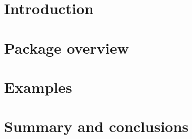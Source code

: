 \documentclass{juliacon}
\begin{document}


\maketitle


\begin{abstract}

Neural networks are typically sensitive to small input perturbations, leading to unexpected or brittle behaviour. 
We present \verb|RobustNeuralNetworks.jl|: a Julia package for neural network models that are constructed to naturally satisfy a set of user-defined robustness metrics. The package is based on the recently proposed Recurrent Equilibrium Network (REN) and Lipschitz-Bounded Deep Network (LBDN) model classes, and is designed to interface directly with Julia's most widely-used machine learning package, \verb|Flux.jl|. We discuss the theory behind our model parameterization, give an overview of the package, and provide a tutorial demonstrating its use in image classification, reinforcement learning, and nonlinear state-observer design.

\end{abstract}

\section{Introduction} \label{sec:introduction}


\section{Package overview} \label{sec:overview}


\section{Examples} \label{sec:examples}





\section{Summary and conclusions} \label{sec:conc}






\end{document}
